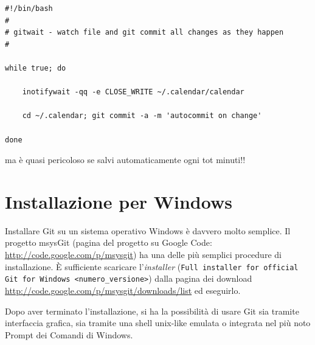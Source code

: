 \documentclass[a4paper,12pt,oneside]{article}
\begin{document}
\begin{lstlisting}
#!/bin/bash
#
# gitwait - watch file and git commit all changes as they happen
#

while true; do

    inotifywait -qq -e CLOSE_WRITE ~/.calendar/calendar

    cd ~/.calendar; git commit -a -m 'autocommit on change'

done
\end{lstlisting}
ma è quasi pericoloso se salvi automaticamente ogni tot minuti!!

\section{Installazione per Windows}
\label{sec:gitwin}

Installare Git su un sistema operativo Windows è davvero molto semplice. Il
progetto \textsf{msysGit} (pagina del progetto su Google Code:
\url{http://code.google.com/p/msysgit}) ha una delle più semplici procedure di
installazione. È sufficiente scaricare l'\emph{installer}
(\lstinline[language={}]|Full installer for official Git for Windows <numero_versione>|)
dalla pagina dei download \url{http://code.google.com/p/msysgit/downloads/list}
ed eseguirlo.

Dopo aver terminato l'installazione, si ha la possibilità di usare Git
sia tramite interfaccia grafica, sia tramite una shell unix-like
emulata o integrata nel più noto Prompt dei Comandi di Windows.
\end{document}
